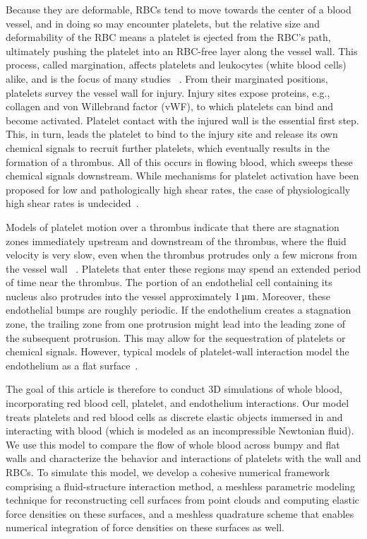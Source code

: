 Because they are deformable, RBCs tend to move towards the center of a blood vessel, and
in doing so may encounter platelets, but the relative size and deformability of the RBC
means a platelet is ejected from the RBC's path, ultimately pushing the platelet into an
RBC-free layer along the vessel wall. This process, called margination, affects platelets
and leukocytes (white blood cells) alike, and is the focus of many studies~%
\cite{Freund:2007kx, Erickson:2010ep, Erickson:2011cf, Zhao:2011do, Kumar:2011dd,
Zhao:2012ggba, Fedosov:2012dy, Kumar:2012ie, Fedosov:2013ul, Muller:2014is,
Fedosov:2014bs, Vahidkhah:2014hy, Vahidkhah:2015ch, Mehrabadi:2016fn}. From their
marginated positions, platelets survey the vessel wall for injury. Injury sites expose
proteins, e.g., collagen and von Willebrand factor (vWF), to which platelets can bind and
become activated. Platelet contact with the injured wall is the essential first step.
This, in turn, leads the platelet to bind to the injury site and release its own chemical
signals to recruit further platelets, which eventually results in the formation of a
thrombus. All of this occurs in flowing blood, which sweeps these chemical signals
downstream. While mechanisms for platelet activation have been proposed for low and
pathologically high shear rates, the case of physiologically high shear rates is
undecided~\cite{Fogelson:2015fb}.

Models of platelet motion over a thrombus indicate that there are stagnation zones
immediately upstream and downstream of the thrombus, where the fluid velocity is very
slow, even when the thrombus protrudes only a few microns from the vessel wall~%
\cite{Skorczewski:2013jn,Wang:2013gs}. Platelets that enter these regions may spend an
extended period of time near the thrombus. The portion of an endothelial cell containing
its nucleus also protrudes into the vessel approximately $1\um$. Moreover, these
endothelial bumps are roughly periodic. If the endothelium creates a stagnation zone, the
trailing zone from one protrusion might lead into the leading zone of the subsequent
protrusion. This may allow for the sequestration of platelets or chemical signals.
However, typical models of platelet-wall interaction model the endothelium as a flat
surface~\cite{Wu:2014gt,Vahidkhah:2015ch}.

The goal of this article is therefore to conduct 3D simulations of whole blood,
incorporating red blood cell, platelet, and endothelium interactions. Our model treats
platelets and red blood cells as discrete elastic objects immersed in and interacting
with blood (which is modeled as an incompressible Newtonian fluid). We use this model to
compare the flow of whole blood across bumpy and flat walls and characterize the behavior
and interactions of platelets with the wall and RBCs. To simulate this model, we develop
a cohesive numerical framework comprising a fluid-structure interaction method, a
meshless parametric modeling technique for reconstructing cell surfaces from point clouds
and computing elastic force densities on these surfaces, and a meshless quadrature scheme
that enables numerical integration of force densities on these surfaces as well.

